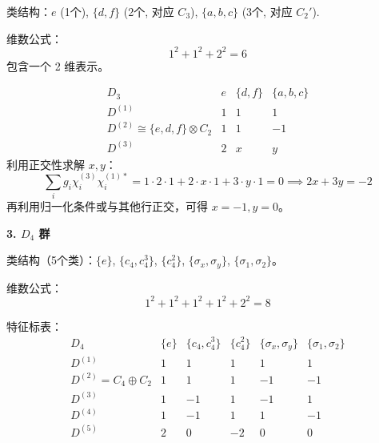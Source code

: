 \begin{example}
    类结构：$e$ (1个), $\{d, f\}$ (2个, 对应 $C_3$), $\{a, b, c\}$ (3个, 对应 $C_2'$).
    
    维数公式：
    \begin{equation}
        1^2 + 1^2 + 2^2 = 6
    \end{equation}
    包含一个 2 维表示。
    
    \begin{equation}
        \begin{array}{c|ccc}
            D_3 & e & \{d, f\} & \{a, b, c\} \\
            \hline
            D^{(1)} & 1 & 1 & 1 \\
            D^{(2)} \cong \{e, d, f\} \otimes C_2 & 1 & 1 & -1 \\
            D^{(3)} & 2 & x & y
        \end{array}
    \end{equation}
    利用正交性求解 $x, y$：
    \begin{equation}
        \sum_i g_i \chi^{(3)}_i \chi^{(1)*}_i = 1\cdot 2 \cdot 1 + 2 \cdot x \cdot 1 + 3 \cdot y \cdot 1 = 0 \implies 2x + 3y = -2
    \end{equation}
    再利用归一化条件或与其他行正交，可得 $x=-1, y=0$。
    
    \textbf{3. $D_4$ 群}
    
    类结构（5个类）：$\{e\}$, $\{c_4, c_4^3\}$, $\{c_4^2\}$, $\{\sigma_x, \sigma_y\}$, $\{\sigma_1, \sigma_2\}$。
    
    维数公式：
    \begin{equation}
        1^2 + 1^2 + 1^2 + 1^2 + 2^2 = 8
    \end{equation}
    
    特征标表：
    \begin{equation}
        \begin{array}{c|ccccc}
            D_4 & \{e\} & \{c_4, c_4^3\} & \{c_4^2\} & \{\sigma_x, \sigma_y\} & \{\sigma_1, \sigma_2\} \\
            \hline
            D^{(1)} & 1 & 1 & 1 & 1 & 1 \\
            D^{(2)} = C_4 \oplus C_2 & 1 & 1 & 1 & -1 & -1 \\
            D^{(3)} & 1 & -1 & 1 & -1 & 1 \\
            D^{(4)} & 1 & -1 & 1 & 1 & -1 \\
            D^{(5)} & 2 & 0 & -2 & 0 & 0
        \end{array}
    \end{equation}
    

\end{example}
